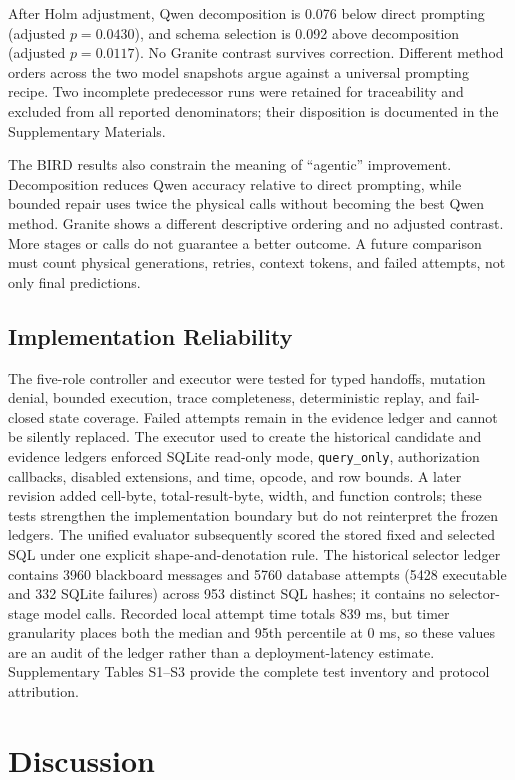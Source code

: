 \documentclass[information,article,submit,moreauthors]{Definitions/mdpi}
\begin{document}
After Holm adjustment, Qwen decomposition is 0.076 below direct prompting (adjusted $p=0.0430$), and schema selection is 0.092 above decomposition (adjusted $p=0.0117$). No Granite contrast survives correction. Different method orders across the two model snapshots argue against a universal prompting recipe. Two incomplete predecessor runs were retained for traceability and excluded from all reported denominators; their disposition is documented in the Supplementary Materials.

The BIRD results also constrain the meaning of ``agentic'' improvement. Decomposition reduces Qwen accuracy relative to direct prompting, while bounded repair uses twice the physical calls without becoming the best Qwen method. Granite shows a different descriptive ordering and no adjusted contrast. More stages or calls do not guarantee a better outcome. A future comparison must count physical generations, retries, context tokens, and failed attempts, not only final predictions.

\subsection{Implementation Reliability}

The five-role controller and executor were tested for typed handoffs, mutation denial, bounded execution, trace completeness, deterministic replay, and fail-closed state coverage. Failed attempts remain in the evidence ledger and cannot be silently replaced. The executor used to create the historical candidate and evidence ledgers enforced SQLite read-only mode, \texttt{query\_only}, authorization callbacks, disabled extensions, and time, opcode, and row bounds. A later revision added cell-byte, total-result-byte, width, and function controls; these tests strengthen the implementation boundary but do not reinterpret the frozen ledgers. The unified evaluator subsequently scored the stored fixed and selected SQL under one explicit shape-and-denotation rule. The historical selector ledger contains 3960 blackboard messages and 5760 database attempts (5428 executable and 332 SQLite failures) across 953 distinct SQL hashes; it contains no selector-stage model calls. Recorded local attempt time totals 839 ms, but timer granularity places both the median and 95th percentile at 0 ms, so these values are an audit of the ledger rather than a deployment-latency estimate. Supplementary Tables S1--S3 provide the complete test inventory and protocol attribution.

\section{Discussion}
\end{document}
